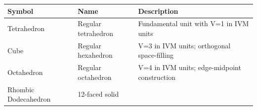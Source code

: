 \documentclass[
  10pt,
]{article}
\begin{document}
\begin{longtable}[]{@{}lll@{}}
\toprule
\begin{minipage}[b]{0.30\columnwidth}\raggedright
Symbol\strut
\end{minipage} & \begin{minipage}[b]{0.30\columnwidth}\raggedright
Name\strut
\end{minipage} & \begin{minipage}[b]{0.30\columnwidth}\raggedright
Description\strut
\end{minipage}\tabularnewline
\midrule
\endhead
\begin{minipage}[t]{0.30\columnwidth}\raggedright
Tetrahedron\strut
\end{minipage} & \begin{minipage}[t]{0.30\columnwidth}\raggedright
Regular tetrahedron\strut
\end{minipage} & \begin{minipage}[t]{0.30\columnwidth}\raggedright
Fundamental unit with V=1 in IVM units\strut
\end{minipage}\tabularnewline
\begin{minipage}[t]{0.30\columnwidth}\raggedright
Cube\strut
\end{minipage} & \begin{minipage}[t]{0.30\columnwidth}\raggedright
Regular hexahedron\strut
\end{minipage} & \begin{minipage}[t]{0.30\columnwidth}\raggedright
V=3 in IVM units; orthogonal space-filling\strut
\end{minipage}\tabularnewline
\begin{minipage}[t]{0.30\columnwidth}\raggedright
Octahedron\strut
\end{minipage} & \begin{minipage}[t]{0.30\columnwidth}\raggedright
Regular octahedron\strut
\end{minipage} & \begin{minipage}[t]{0.30\columnwidth}\raggedright
V=4 in IVM units; edge-midpoint construction\strut
\end{minipage}\tabularnewline
\begin{minipage}[t]{0.30\columnwidth}\raggedright
Rhombic Dodecahedron\strut
\end{minipage} & \begin{minipage}[t]{0.30\columnwidth}\raggedright
12-faced solid\strut
\end{minipage} & \begin{minipage}[t]{0.30\columnwidth}\raggedright

\end{minipage}
\end{longtable}
\end{document}
